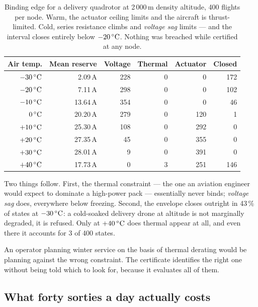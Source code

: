 \documentclass[11pt,letterpaper]{article}
\theoremstyle{definition}
\theoremstyle{remark}
\newcommand{\SI}[2]{#1\,#2}
\newcommand{\degreeCelsius}{\degC}
\newcommand{\degC}{\ifmmode{^\circ}\mathrm{C}\else\textdegree C\fi}
\begin{document}
\begin{table}[t]\centering\small
\caption{Binding edge for a delivery quadrotor at 2\,000\,m density altitude, 400 flights per
node. Warm, the actuator ceiling limits and the aircraft is thrust-limited. Cold, series
resistance climbs and \emph{voltage sag} limits --- and the interval closes entirely below
$\SI{-20}{\degreeCelsius}$. Nothing was breached while certified at any node.}
\label{tab:coldsoak}
\begin{tabular}{@{}rrrrrr@{}}
\toprule
\textbf{Air temp.} & \textbf{Mean reserve} & \textbf{Voltage} & \textbf{Thermal} &
\textbf{Actuator} & \textbf{Closed} \\
\midrule
$\SI{-30}{\degreeCelsius}$ & 2.09\,A  & 228 & 0 & 0   & 172 \\
$\SI{-20}{\degreeCelsius}$ & 7.11\,A  & 298 & 0 & 0   & 102 \\
$\SI{-10}{\degreeCelsius}$ & 13.64\,A & 354 & 0 & 0   & 46  \\
$\SI{0}{\degreeCelsius}$   & 20.20\,A & 279 & 0 & 120 & 1   \\
$\SI{+10}{\degreeCelsius}$ & 25.30\,A & 108 & 0 & 292 & 0   \\
$\SI{+20}{\degreeCelsius}$ & 27.35\,A & 45  & 0 & 355 & 0   \\
$\SI{+30}{\degreeCelsius}$ & 28.01\,A & 9   & 0 & 391 & 0   \\
$\SI{+40}{\degreeCelsius}$ & 17.73\,A & 0   & 3 & 251 & 146 \\
\bottomrule
\end{tabular}
\end{table}

Two things follow. First, the thermal constraint --- the one an aviation engineer would expect to
dominate a high-power pack --- essentially never binds; \emph{voltage sag} does, everywhere
below freezing. Second, the envelope closes outright in 43\,\% of states at $\SI{-30}{\degreeCelsius}$: a
cold-soaked delivery drone at altitude is not marginally degraded, it is refused. Only at
$\SI{+40}{\degreeCelsius}$ does thermal appear at all, and even there it accounts for 3 of 400 states.

An operator planning winter service on the basis of thermal derating would be planning against
the wrong constraint. The certificate identifies the right one without being told which to look
for, because it evaluates all of them.

\subsection{What forty sorties a day actually costs}
\end{document}
